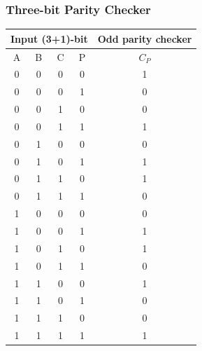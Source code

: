 \subsubsection*{Three-bit Parity Checker}
\vspace{-1.2em}
\begin{longtable}[c]{cccc|c}
\multicolumn{4}{l|}{Input (3+1)-bit} & \multicolumn{1}{l}{Odd parity checker} \\ \hline
\endfirsthead
%
\endhead
%
\hline
\endfoot
%
\endlastfoot
%
A       & B       & C       & P      & $C_P$                                   \\ \hline
0       & 0       & 0       & 0      & 1                                      \\
0       & 0       & 0       & 1      & 0                                      \\
0       & 0       & 1       & 0      & 0                                      \\
0       & 0       & 1       & 1      & 1                                      \\
0       & 1       & 0       & 0      & 0                                      \\
0       & 1       & 0       & 1      & 1                                      \\
0       & 1       & 1       & 0      & 1                                      \\
0       & 1       & 1       & 1      & 0                                      \\
1       & 0       & 0       & 0      & 0                                      \\
1       & 0       & 0       & 1      & 1                                      \\
1       & 0       & 1       & 0      & 1                                      \\
1       & 0       & 1       & 1      & 0                                      \\
1       & 1       & 0       & 0      & 1                                      \\
1       & 1       & 0       & 1      & 0                                      \\
1       & 1       & 1       & 0      & 0                                      \\
1       & 1       & 1       & 1      & 1                                      \\ \hline
\end{longtable}
